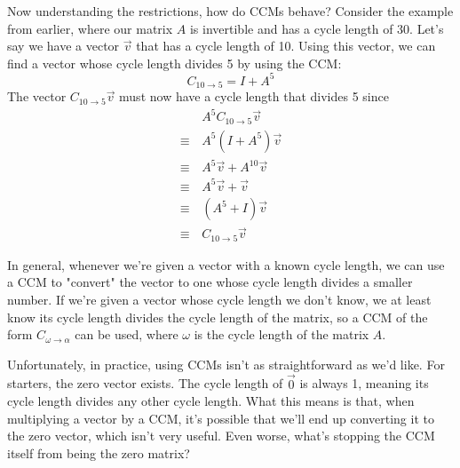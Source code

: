 \documentclass[a4paper, 12pt, reqno]{amsart}
\begin{document}
	Now understanding the restrictions, how do CCMs behave? Consider the example from earlier, where our matrix $A$ is invertible and has a cycle length of 30. Let's say we
	have a vector $\vec{v}$ that has a cycle length of 10. Using this vector, we can find a vector whose cycle length divides 5 by using the CCM:
	\[
		C_{10 \rightarrow 5} = I + A^{5}
	\]
	The vector $C_{10 \rightarrow 5}\vec{v}$ must now have a cycle length that divides 5 since
	\begin{align*}
	           & \, A^{5}C_{10 \rightarrow 5}\vec{v} \\
		\equiv & \, A^{5}(I + A^{5})\vec{v}          \\
		\equiv & \, A^{5}\vec{v} + A^{10}\vec{v}     \\
		\equiv & \, A^{5}\vec{v} + \vec{v}           \\
		\equiv & \, (A^{5} + I)\vec{v}               \\
		\equiv & \, C_{10 \rightarrow 5}\vec{v}
	\end{align*}
	
	In general, whenever we're given a vector with a known cycle length, we can use a CCM to "convert" the vector to one whose cycle length divides a smaller number. If 
	we're given a vector whose cycle length we don't know, we at least know its cycle length divides the cycle length of the matrix, so a CCM of the form 
	$C_{\omega \rightarrow \alpha}$ can be used, where $\omega$ is the cycle length of the matrix $A$.
	
	Unfortunately, in practice, using CCMs isn't as straightforward as we'd like. For starters, the zero vector exists. The cycle length of $\vec{0}$ is always 1, meaning 
	its cycle length divides any other cycle length. What this means is that, when multiplying a vector by a CCM, it's possible that we'll end up converting it to the zero
	vector, which isn't very useful. Even worse, what's stopping the CCM itself from being the zero matrix? 
	
\end{document}
